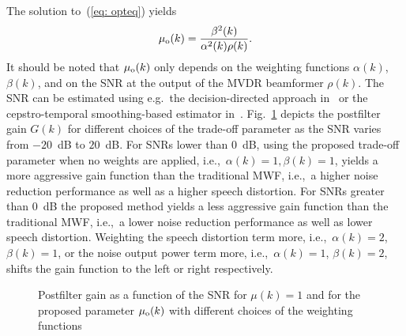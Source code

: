 \documentclass{article}
\begin{document}
The solution to~(\ref{eq: opteq}) yields
\begin{equation}
  \vspace{-0.1cm}
  \label{eq: optpar}
  \mu_{\rm o}(k) = \frac{\beta^2(k)}{\alpha^2(k) \rho(k)}.
\end{equation}
It should be noted that $\mu_{\rm o}(k)$ only depends on the weighting functions $\alpha(k)$, $\beta(k)$, and on the SNR at the output of the MVDR beamformer $\rho(k)$.
The SNR can be estimated using e.g.~the decision-directed approach in~\cite{Ephraim_ITASSP_1984} or the cepstro-temporal smoothing-based estimator in~\cite{Breihaupt_ICASSP_2008}. \newline
Fig.~\ref{fig: gain} depicts the postfilter gain $G(k)$ for different choices of the trade-off parameter as the SNR varies from $-20$~dB to $20$~dB.
For SNRs lower than $0$~dB, using the proposed trade-off parameter when no weights are applied, i.e.,~$\alpha(k)=1, \beta(k)=1$, yields a more aggressive gain function than the traditional MWF, i.e.,~a higher noise reduction performance as well as a higher speech distortion.
For SNRs greater than $0$~dB the proposed method yields a less aggressive gain function than the traditional MWF, i.e.,~a lower noise reduction performance as well as lower speech distortion.
Weighting the speech distortion term more, i.e.,~$\alpha(k) = 2$, $\beta(k) = 1$, or the noise output power term more, i.e.,~$\alpha(k) = 1$, $ \beta(k) = 2$, shifts the gain function to the left or right respectively.  
\begin{figure}[t!]
\centering

\vspace{-0.7cm}
\caption{Postfilter gain as a function of the SNR for $\mu(k) = 1$ and for the proposed parameter $\mu_{\rm o}(k)$ with different choices of the weighting functions}
\vspace{-0.2cm}
\label{fig: gain}
\vspace{-0.2cm}
\end{figure}
\end{document}
